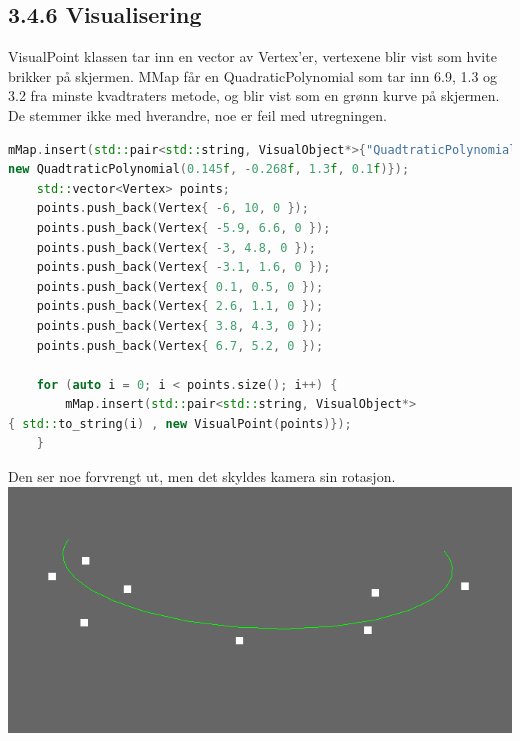 \documentclass[a4paper,norsk]{article}
\begin{document}
\subsection{3.4.6 Visualisering}
VisualPoint klassen tar inn en vector av Vertex'er, vertexene blir vist som hvite brikker på skjermen. MMap får en QuadraticPolynomial som tar inn 6.9, 1.3 og 3.2 fra minste kvadtraters metode, og blir vist som en grønn kurve på skjermen.
De stemmer ikke med hverandre, noe er feil med utregningen.
\begin{lstlisting}[language=C++, caption={renderwindow.cpp}]
mMap.insert(std::pair<std::string, VisualObject*>{"QuadtraticPolynomial", 
new QuadtraticPolynomial(0.145f, -0.268f, 1.3f, 0.1f)});
    std::vector<Vertex> points;
    points.push_back(Vertex{ -6, 10, 0 });
    points.push_back(Vertex{ -5.9, 6.6, 0 });
    points.push_back(Vertex{ -3, 4.8, 0 });
    points.push_back(Vertex{ -3.1, 1.6, 0 });
    points.push_back(Vertex{ 0.1, 0.5, 0 });
    points.push_back(Vertex{ 2.6, 1.1, 0 });
    points.push_back(Vertex{ 3.8, 4.3, 0 });
    points.push_back(Vertex{ 6.7, 5.2, 0 });

    for (auto i = 0; i < points.size(); i++) {
        mMap.insert(std::pair<std::string, VisualObject*>
{ std::to_string(i) , new VisualPoint(points)});
    }
\end{lstlisting}
Den ser noe forvrengt ut, men det skyldes kamera sin rotasjon.
\centering
\includegraphics[width=\textwidth]{MatteOblig2Minstekvadratersmetode}
\end{document}
